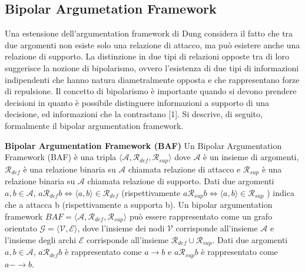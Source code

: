 \subsection{Bipolar Argumetation Framework}
Una estensione dell'argumentation framework di Dung considera il fatto che tra due argomenti non esiste solo una relazione di attacco, ma può esistere anche una relazione di supporto. La distinzione in due tipi di relazioni opposte tra di loro suggerisce la nozione di bipolarismo, ovvero l’esistenza di due tipi di informazioni indipendenti che hanno natura diametralmente opposta e che rappresentano forze di repulsione. Il concetto di bipolarismo è importante quando si devono prendere decisioni in quanto è possibile distinguere informazioni a supporto di una decisione, ed informazioni che la contrastano [1]. Si descrive, di seguito, formalmente il bipolar argumentation framework.

\bigskip
\begin{defn} \textbf{Bipolar Argumentation Framework (BAF)} Un Bipolar Argumentation Framework (BAF) è una tripla $⟨\mathcal{A}, \mathcal{R}_{def}, \mathcal{R}_{sup}⟩$ dove $\mathcal{A}$ è un insieme di argomenti, $\mathcal{R}_{def}$ è una relazione binaria su $\mathcal{A}$ chiamata relazione di attacco e $\mathcal{R}_{sup}$ è una relazione binaria su $\mathcal{A}$ chiamata relazione di supporto. Dati due argomenti $a, b ∈ \mathcal{A}$, $a \mathcal{R}_{def} b ⇔ ⟨a, b⟩ ∈ \mathcal{R}_{def}$ (rispettivamente  $a \mathcal{R}_{sup} b ⇔ ⟨a, b⟩ ∈  \mathcal{R}_{sup}$ ) indica che a attacca b (rispettivamente a supporta b). Un bipolar argumentation framework $BAF = ⟨\mathcal{A}, \mathcal{R}_{def} , \mathcal{R}_{sup} ⟩$ può essere rappresentato come un grafo orientato $\mathcal{G} = ⟨\mathcal{V}, \mathcal{E}⟩$, dove l'insieme dei nodi $\mathcal{V}$ corrisponde all'insieme $\mathcal{A}$ e l'insieme degli archi $\mathcal{E}$ corrisponde all'insieme $\mathcal{R}_{def} ∪ \mathcal{R}_{sup}$. Dati due argomenti $a, b ∈ \mathcal{A}$, $a \mathcal{R}_{def} b$ è rappresentato come $a → b$ e $a \mathcal{R}_{sup} b$ è rappresentato come $a -→ b$.

\end{defn}


